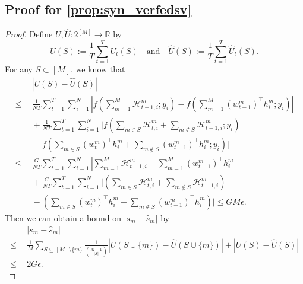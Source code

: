 \subsection{Proof for \autoref{prop:syn_verfedsv}}
\begin{proof}
    Define $U,\hat U: 2^{[M]}\to\mathbb{R}$ by 
    \[U(S) := \frac{1}{T}\sum_{t=1}^T U_t(S) \quad\text{and}\quad \hat U(S) := \frac{1}{T}\sum_{t=1}^T \hat U_t(S).\]
    For any $S \subset [M]$, we know that 
    \begin{align*}
        &~|U(S) - \hat U(S)| \\
        \leq~&~\frac{1}{NT}\sum_{t=1}^T\sum_{i=1}^N \left|f\left( \sum_{m=1}^M \mathcal{H}_{t-1, i}^m; y_i\right) - f\left( \sum_{m=1}^M (w^m_{t-1})^\intercal h^m_i; y_i\right)\right| \\
        &~+ \frac{1}{NT}\sum_{t=1}^T\sum_{i=1}^N \bigg|f\left( \sum_{m\in S} \mathcal{H}_{t, i}^m + \sum_{m\notin S} \mathcal{H}_{t-1, i}^m; y_i\right) \\
        &~- f\left( \sum_{m\in S} (w^m_{t})^\intercal h^m_i + \sum_{m\notin S} (w^m_{t-1})^\intercal h^m_i; y_i\right)\bigg|\\
        \leq~&~\frac{G}{NT}\sum_{t=1}^T\sum_{i=1}^N \left|\sum_{m=1}^M \mathcal{H}_{t-1, i}^m -  \sum_{m=1}^M (w^m_{t-1})^\intercal h^m_i\right|\\
        &~+ \frac{G}{NT}\sum_{t=1}^T\sum_{i=1}^N \bigg|\left( \sum_{m\in S} \mathcal{H}_{t, i}^m + \sum_{m\notin S} \mathcal{H}_{t-1, i}^m\right) \\ 
        &~- \left( \sum_{m\in S} (w^m_{t})^\intercal h^m_i + \sum_{m\notin S} (w^m_{t-1})^\intercal h^m_i\right)\bigg| \leq GM\epsilon.
    \end{align*}
    Then we can obtain a bound on $|s_m - \hat s_m|$ by 
    \begin{align*}
        ~&~|s_m - \hat s_m| \\
        \leq ~&~ \frac{1}{M}\sum_{S \subseteq [M] \setminus \{m\}} \frac{1}{\binom{M-1}{|S|}} \left|U(S\cup\{m\}) - \hat U(S\cup\{m\})\right| + \left|U(S) - \hat U(S)\right|\\
        \leq ~&~ 2G\epsilon.
    \end{align*}
\end{proof}

